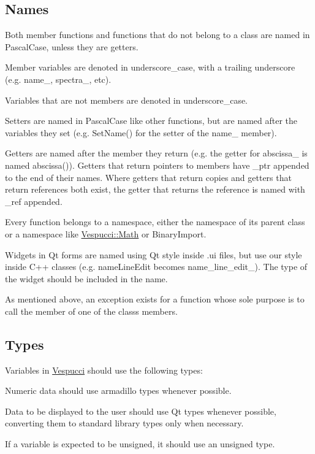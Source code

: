 \subsection*{Names }


\begin{DoxyItemize}
\item Both member functions and functions that do not belong to a class are named in Pascal\+Case, unless they are getters.
\item Member variables are denoted in underscore\+\_\+case, with a trailing underscore (e.\+g. {\ttfamily name\+\_\+}, {\ttfamily spectra\+\_\+}, etc).
\item Variables that are not members are denoted in underscore\+\_\+case.
\item Setters are named in Pascal\+Case like other functions, but are named after the variables they set (e.\+g. {\ttfamily Set\+Name()} for the setter of the {\ttfamily name\+\_\+} member).
\item Getters are named after the member they return (e.\+g. the getter for {\ttfamily abscissa\+\_\+} is named {\ttfamily abscissa()}). Getters that return pointers to members have {\ttfamily \+\_\+ptr} appended to the end of their names. Where getters that return copies and getters that return references both exist, the getter that returns the reference is named with {\ttfamily \+\_\+ref} appended.
\item Every function belongs to a namespace, either the namespace of its parent class or a namespace like {\ttfamily \hyperlink{namespace_vespucci_1_1_math}{Vespucci\+::\+Math}} or {\ttfamily Binary\+Import}.
\item Widgets in Qt forms are named using Qt style inside .ui files, but use our style inside C++ classes (e.\+g. {\ttfamily name\+Line\+Edit} becomes {\ttfamily name\+\_\+line\+\_\+edit\+\_\+}). The type of the widget should be included in the name.
\item As mentioned above, an exception exists for a function whose sole purpose is to call the member of one of the class\textquotesingle{}s members.
\end{DoxyItemize}

\subsection*{Types }

Variables in \hyperlink{namespace_vespucci}{Vespucci} should use the following types\+:
\begin{DoxyItemize}
\item Numeric data should use armadillo types whenever possible.
\item Data to be displayed to the user should use Qt types whenever possible, converting them to standard library types only when necessary.
\item If a variable is expected to be unsigned, it should use an unsigned type.
\end{DoxyItemize}

